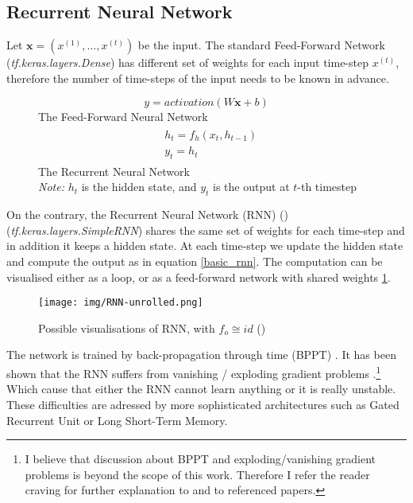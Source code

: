 \subsection{Recurrent Neural Network}

Let $\mathbf{x}=(x^{(1)},\dots,x^{(t)})$ be the input. The standard Feed-Forward Network (\emph{tf.keras.layers.Dense}) has different set of weights for each input time-step $x^{(t)}$, therefore the number of time-steps of the input needs to be known in advance.

\begin{figure}[!h]
\centering
\begin{equation}
y = activation(W\mathbf{x} + b)
\end{equation}
The Feed-Forward Neural Network
\begin{align} \label{basic_rnn}
\begin{split}
    &h_t = f_h(x_t, h_{t-1}) \\
    &y_t = h_t
\end{split}
\end{align}
The Recurrent Neural Network \\
\footnotesize{\textit{Note:} $h_t$ is the hidden state, and $y_t$ is the output at $t$-th timestep}
\end{figure}
On the contrary, the Recurrent Neural Network (RNN) (\citep{rumelhart_rnn1988}) (\emph{tf.keras.layers.SimpleRNN}) shares the same set of weights for each time-step and in addition it keeps a hidden state. At each time-step we update the hidden state and compute the output as in equation \ref{basic_rnn}. The computation can be visualised either as a loop, or as a feed-forward network with shared weights \ref{vis_rnn}.


\begin{figure}[!h]
    \texttt{[image: img/RNN-unrolled.png]}
    \caption{Possible visualisations of RNN, with $f_o \cong id$ (\citep{Olah2015})} \label{vis_rnn}
\end{figure}

The network is trained by back-propagation through time (BPPT) \citep{bpptWerbos1990}. It has been shown that the RNN suffers from vanishing / exploding gradient problems \citep{hochreiter1997}.\footnote{I believe that discussion about BPPT and exploding/vanishing gradient problems is beyond the scope of this work. Therefore I refer the reader craving for further explanation to \citep{Goodfellow-et-al-2016} and to referenced papers.} Which cause that either the RNN cannot learn anything or it is really unstable. These difficulties are adressed by more sophisticated architectures such as Gated Recurrent Unit or Long Short-Term Memory.


